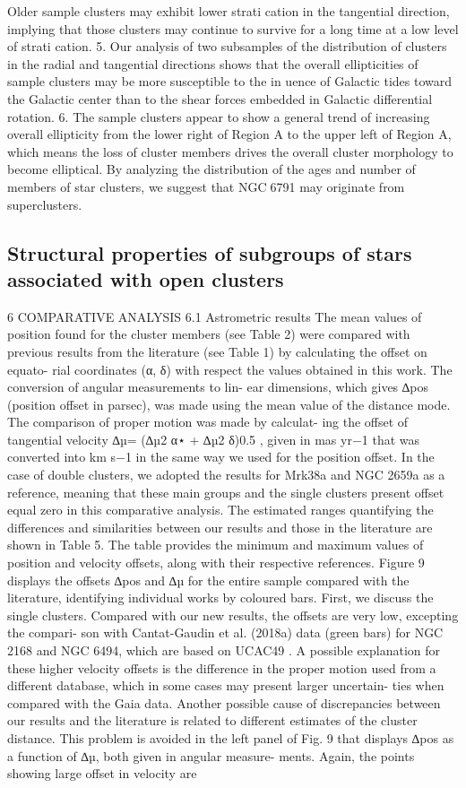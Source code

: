 \documentclass[../Main.tex]{subfiles}
\begin{document}
{Older sample clusters may exhibit lower strati cation in
the tangential direction, implying that those clusters may
continue to survive for a long time at a low level of
strati cation.
5. Our analysis of two subsamples of the distribution of
clusters in the radial and tangential directions shows that
the overall ellipticities of sample clusters may be more
susceptible to the in uence of Galactic tides toward the
Galactic center than to the shear forces embedded in
Galactic differential rotation.
6. The sample clusters appear to show a general trend of
increasing overall ellipticity from the lower right of
Region A to the upper left of Region A, which means the
loss of cluster members drives the overall cluster
morphology to become elliptical. By analyzing the
distribution of the ages and number of members of star
clusters, we suggest that NGC6791 may originate from
superclusters.
\subsection{Structural properties of subgroups of stars associated with open clusters}

6 COMPARATIVE ANALYSIS
6.1 Astrometric results
The mean values of position found for the cluster members
(see Table 2) were compared with previous results from the
literature (see Table 1) by calculating the offset on equato-
rial coordinates (α, δ) with respect the values obtained in
this work. The conversion of angular measurements to lin-
ear dimensions, which gives ∆pos (position offset in parsec),
was made using the mean value of the distance mode.
The comparison of proper motion was made by calculat-
ing the offset of tangential velocity ∆µ= (∆µ2
α⋆ + ∆µ2
δ)0.5
,
given in mas yr−1 that was converted into km s−1 in the
same way we used for the position offset.
In the case of double clusters, we adopted the results for
Mrk38a and NGC 2659a as a reference, meaning that these
main groups and the single clusters present offset equal zero
in this comparative analysis.
The estimated ranges quantifying the differences and
similarities between our results and those in the literature
are shown in Table 5. The table provides the minimum and
maximum values of position and velocity offsets, along with
their respective references. Figure 9 displays the offsets ∆pos
and ∆µ for the entire sample compared with the literature,
identifying individual works by coloured bars.
First, we discuss the single clusters. Compared with our
new results, the offsets are very low, excepting the compari-
son with Cantat-Gaudin et al. (2018a) data (green bars) for
NGC 2168 and NGC 6494, which are based on UCAC49
.
A possible explanation for these higher velocity offsets is
the difference in the proper motion used from a different
database, which in some cases may present larger uncertain-
ties when compared with the Gaia data. Another possible
cause of discrepancies between our results and the literature
is related to different estimates of the cluster distance. This
problem is avoided in the left panel of Fig. 9 that displays
∆pos as a function of ∆µ, both given in angular measure-
ments. Again, the points showing large offset in velocity are

}
\end{document}
